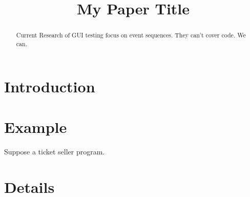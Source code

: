 \documentclass{article}
\begin{document}
\title{My Paper Title}


\maketitle

\begin{abstract}
  Current Research of GUI testing focus on event sequences.
  They can't cover code.
  We can.
\end{abstract}

\section{Introduction}\label{section:introduction}

\section{Example}
Suppose a ticket seller program.

\section{Details}


\label{section:relatedwork}



\end{document}
